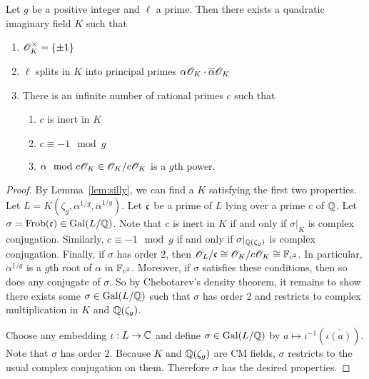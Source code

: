 \documentclass{amsart}
\begin{document}
\begin{lemma}\label{lem:K-exists}
  Let $g$ be a positive integer and $\ell$ a prime. Then there exists a quadratic imaginary field $K$ such that
  \begin{enumerate}
    \item $\mathscr{O}_K^\times = \{\pm 1\}$
    \item $\ell$ splits in $K$ into principal primes $\alpha\mathscr{O}_K \cdot \overline{\alpha}\mathscr{O}_K$
    \item There is an infinite number of rational primes $c$ such that
    \begin{enumerate}
      \item $c$ is inert in $K$
      \item $c \equiv -1 \mod{g}$
      \item $\alpha \mod c\mathscr{O}_K \in \mathscr{O}_K/c\mathscr{O}_K$ is a $g$th power.
    \end{enumerate}
  \end{enumerate}
\end{lemma}
\begin{proof}
  By Lemma~\ref{lem:silly}, we can find a $K$ satisfying the first two properties. Let $L = K(\zeta_g,\alpha^{1/g},\overline{\alpha}^{1/g})$.
  Let $\frak{c}$ be a prime of $L$ lying over a prime $c$ of $\mathbb{Q}$. Let $\sigma = \mathrm{Frob}(\frak{c}) \in \operatorname{Gal}(L/\mathbb{Q})$. Note that $c$ is inert in $K$ if and only if $\sigma|_K$ is complex conjugation. Similarly, $c \equiv -1 \mod{g}$ if and only if $\sigma|_{\mathbb{Q}(\zeta_g)}$ is complex conjugation.
Finally, if $\sigma$ has order $2$, then $\mathscr{O}_L/\frak{c} \cong \mathscr{O}_K/c\mathscr{O}_K \cong \mathbb{F}_{c^2}$. In particular, $\alpha^{1/g}$ is a $g$th root of $\alpha$ in $\mathbb{F}_{c^2}$. Moreover, if $\sigma$ satisfies these conditions, then so does any conjugate of $\sigma$. So by Chebotarev's density theorem, it remains to show there exists some $\sigma \in \operatorname{Gal}(L/\mathbb{Q})$ such that $\sigma$ has order $2$ and restricts to complex multiplication in $K$ and $\mathbb{Q}(\zeta_g)$.

  Choose any embedding $\iota: L \to \mathbb{C}$ and define $\sigma \in \operatorname{Gal}(L/\mathbb{Q})$ by $a \mapsto \iota^{-1}(\overline{\iota(a)})$. Note that $\sigma$ has order $2$. Because $K$ and $\mathbb{Q}(\zeta_g)$ are CM fields, $\sigma$ restricts to the usual complex conjugation on them. Therefore $\sigma$ has the desired properties.
\end{proof}
\end{document}
